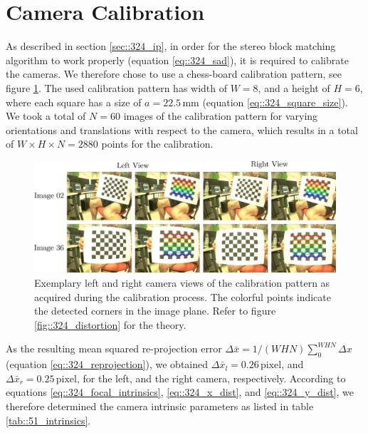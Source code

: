 \section{Camera Calibration}
\label{sec::51_cc}
As described in section \ref{sec::324_ip}, in order for the stereo block matching algorithm to work properly (equation \ref{eq::324_sad}), it is required to calibrate the cameras. We therefore chose to use a chess-board calibration pattern, see figure \ref{fig::51_calib}. The used calibration pattern has width of $W=8$, and a height of $H=6$, where each square has a size of $a=22.5\,\text{mm}$ (equation \ref{eq::324_square_size}). We took a total of $N=60$ images of the calibration pattern for varying orientations and translations with respect to the camera, which results in a total of $W\times H\times N = 2880$ points for the calibration. 
\begin{figure}[h]
	\centering
	\includegraphics[scale=.28]{chapters/05_experiments/01_camera_calibration/calib.png}
	\caption{Exemplary left and right camera views of the calibration pattern as acquired during the calibration process. The colorful points indicate the detected corners in the image plane. Refer to figure \ref{fig::324_distortion} for the theory.}
	\label{fig::51_calib}
\end{figure}
As the resulting mean squared re-projection error $\Delta \bar{x} = 1/(WHN)\sum_0^{WHN} \Delta x$ (equation \ref{eq::324_reprojection}), we obtained $\Delta \bar{x}_l = 0.26\, \text{pixel}$, and $\Delta \bar{x}_r = 0.25\,\text{pixel}$, for the left, and the right camera, respectively. According to equations \ref{eq::324_focal_intrinsics}, \ref{eq::324_x_dist}, and \ref{eq::324_y_dist}, we therefore determined the camera intrinsic parameters as listed in table \ref{tab::51_intrinsics}.
